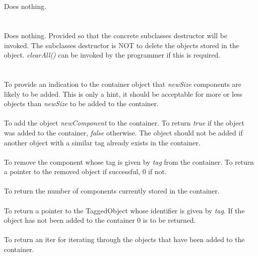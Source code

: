  \\
 \\
Does nothing.\\

 \\
 \\ 
Does nothing. Provided so that the concrete subclasses destructor will
be invoked. The subclasses destructor is NOT to delete the objects
stored in the object. {\em clearAll()} can be invoked by the
programmer if this is required. \\

 \\
\\
To provide an indication to the container object that {\em newSize}
components are likely to be added. This is only a hint, it should be
acceptable for more or less objects than {\em newSize} to be added to
the container. \\

\\
To add the object {\em newComponent} to the container. To return
{\em true} if the object was added to the container, {\em false}
otherwise. The object should not be added if another object with a
similar tag already exists in the container.\\
 
\\
To remove the component whose tag is given by {\em tag} from the
container. To return a pointer to the removed object if successful,
$0$ if not.\\ 

\\
To return the number of components currently stored in the container. \\

\\
To return a pointer to the TaggedObject whose identifier is given by
{\em tag}. If the object has not been added to the container $0$ is to
be returned. \\

\\
To return an iter for iterating through the objects that have been
added to the container. \\

